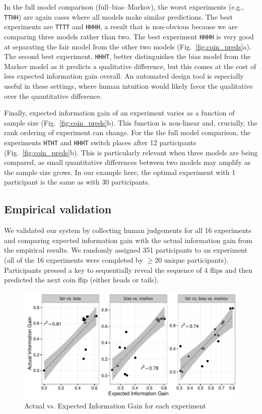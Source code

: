 \documentclass{article}
\begin{document}
In the full model comparison (full--bias--Markov), the worst experiments (e.g., \lstinline{TTHH}) are again cases where all models make similar predictions.
The best experiments are \lstinline{TTTT} and \lstinline{HHHH}, a result that is non-obvious because we are comparing three models rather than two.
The best experiment \lstinline{HHHH} is very good at separating the fair model from the other two models (Fig.~\ref{fig:coin_preds}a).
The second best experiment, \lstinline{HHHT}, better distinguishes the bias model from the Markov model as it predicts a qualitative difference, but this comes at the cost of less expected information gain overall.
An automated design tool is especially useful in these settings, where human intuition would likely favor the qualitative over the quantitative difference.

Finally, expected information gain of an experiment varies as a function of sample size (Fig.~\ref{fig:coin_preds}b).
This function is non-linear and, crucially, the rank ordering of experiment can change.
For the the full model comparison, the experiments \lstinline{HTHT} and \lstinline{HHHT} switch places after 12 participants (Fig.~\ref{fig:coin_preds}b).
This is particularly relevant when three models are being compared, as small quantitative differences between two models may amplify as the sample size grows.
In our example here, the optimal experiment with 1 participant is the same as with 30 participants.


\subsection{Empirical validation}
We validated our system by collecting human judgements for all 16 experiments and comparing expected information gain with the actual information gain from the empirical results.
We randomly assigned 351 participants to an experiment (all of the 16 experiments were completed by $\geq$20 unique participants).
Participants pressed a key to sequentially reveal the sequence of 4 flips and then predicted the next coin flip (either heads or tails).

\begin{figure}[h]
  \centering
  \includegraphics[width=0.7\columnwidth]{img/coin_eig_aig_scatter_noText.pdf}
  \caption{Actual vs. Expected Information Gain for each experiment}
  \label{fig:aig_vs_eig}
\end{figure}
\end{document}
